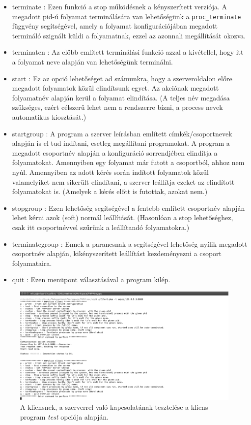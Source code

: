 \documentclass[12pt]{report}
\begin{document}
\begin{itemize}
\item terminate : Ezen funkció a stop működésnek a kényszerített verziója. A megadott pid-ú folyamat terminálására van lehetőségünk a \verb|proc_terminate| függvény segítségével, amely a folyamat konfigurációjában megadott termináló szignált küldi a folyamatnak, ezzel az azonnali megállítását okozva.
\item terminaten : Az előbb említett terminálási funkció azzal a kivétellel, hogy itt a folyamat neve alapján van lehetőségünk terminálni.
\item start : Ez az opció lehetőséget ad számunkra, hogy a szerveroldalon előre megadott folyamatok közül elindítsunk egyet. Az akciónak megadott folyamatnév alapján kerül a folyamat elindítása. (A teljes név megadása szükséges, ezért célszerű lehet nem a rendszerre bízni, a process nevek automatikus kiosztását.)
\item startgroup : A program a szerver leírásban említett címkék/csoportnevek alapján is el tud indítani, esetleg megállítani programokat.  A program a megadott csoportnév alapján a konfiguráció sorrendjében elindítja a folyamatokat. Amennyiben egy folyamat már futott a csoportból, ahhoz nem nyúl. Amennyiben az adott kérés során indított folyamatok közül valamelyiket nem sikerült elindítani, a szerver leállítja ezeket az elindított folyamatokat is. (Amelyek a kérés előtt is futottak, azokat nem.)
\item stopgroup : Ezen lehetőség segítségével a fentebb említett csoportnév alapján lehet kérni azok (soft) normál leállítását. (Hasonlóan a stop lehetőséghez, csak itt csoportnévvel szűrünk a leállítandó folyamatokra.)
\item terminategroup : Ennek a parancsnak a segítségével lehetőség nyílik megadott csoportnév alapján, kikényszerített leállítást kezdeményezni a csoport folyamataira.
\item quit : Ezen menüpont választásával a program kilép. 
\end{itemize}
 \begin{figure}[ht]
  \centering
  \includegraphics[width=15cm]{pics/test.png}
	  \caption{A kliensnek, a szerverrel való kapcsolatának tesztelése a kliens program \textit
      {test} opciója alapján.}
      \label{fig:clitest}
  \end{figure}
  
\end{document}
